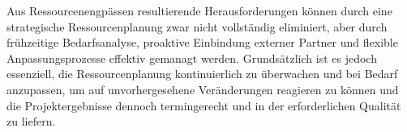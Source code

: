 \par Aus Ressourcenengpässen resultierende Herausforderungen können durch eine strategische Ressourcenplanung zwar nicht vollständig eliminiert, aber durch frühzeitige Bedarfsanalyse, proaktive Einbindung externer Partner und flexible Anpassungsprozesse effektiv gemanagt werden. Grundsätzlich ist es jedoch essenziell, die Ressourcenplanung kontinuierlich zu überwachen und bei Bedarf anzupassen, um auf unvorhergesehene Veränderungen reagieren zu können und die Projektergebnisse dennoch termingerecht und in der erforderlichen Qualität zu liefern.